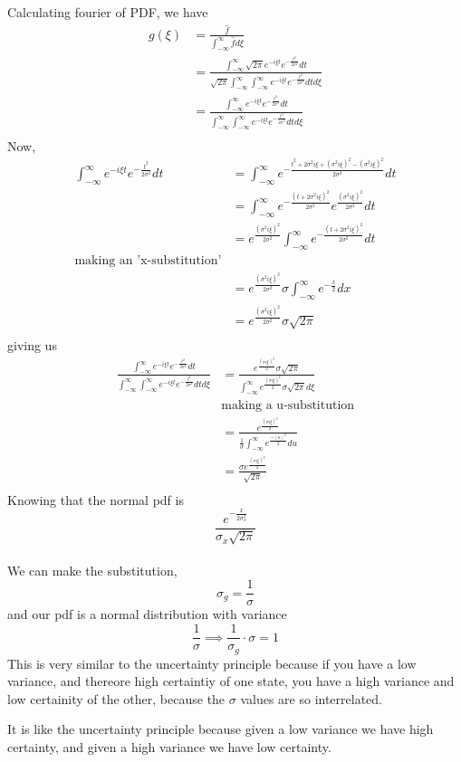 \documentclass[letterpaper,12pt]{article}
\theoremstyle{definition}
\begin{document}
Calculating fourier of PDF, we have
\begin{align*}
    g(\xi) &= \frac{\hat f}{\int^\infty _{-\infty}\hat f d\xi}\\
    & = \frac{\int^\infty_{-\infty} \sqrt{2\pi} e^{-i \xi t} e^{-\frac{t^2}{2\sigma^2} }dt}{\sqrt{2\pi}\int^\infty_{-\infty} \int^\infty_{-\infty} e^{-i \xi t}e^{-\frac{t^2}{2\sigma^2}}dt d\xi}\\
    & = \frac{\int^\infty_{-\infty} e^{-i \xi t} e^{-\frac{t^2}{2\sigma^2} }dt}{\int^\infty_{-\infty} \int^\infty_{-\infty} e^{-i \xi t}e^{-\frac{t^2}{2\sigma^2}}dt d\xi}\\
\end{align*}
Now,
\begin{align*}
    \int^\infty_{-\infty} e^{-i \xi t} e^{-\frac{t^2}{2\sigma^2} }dt 
    & = \int^\infty_{-\infty} e^{-\frac{t^2 + 2\sigma^2 i \xi + (\sigma^2 i \xi)^2 - (\sigma^2 i \xi)^2}{2\sigma^2} }dt \\
    & = \int^\infty_{-\infty} e^{-\frac{(t+ 2\sigma^2 i \xi)^2}{2\sigma^2}}e^{\frac{(\sigma^2 i \xi )^2}{2\sigma^2}  }dt \\
    & = e^{\frac{(\sigma^2 i \xi )^2}{2\sigma^2}} \int^\infty_{-\infty} e^{-\frac{(t+ 2\sigma^2 i \xi)^2}{2\sigma^2}}dt \\ 
    \text{making an 'x-substitution'}&\\
    & = e^{\frac{(\sigma^2 i \xi )^2}{2\sigma^2}} \sigma \int^\infty_{-\infty} e^{-\frac{x}{2}}dx \\ 
    & = e^{\frac{(\sigma^2 i \xi )^2}{2\sigma^2}} \sigma \sqrt{2\pi} \\  
\end{align*}
giving us
\begin{align*}
    \frac{\int^\infty_{-\infty} e^{-i \xi t} e^{-\frac{t^2}{2\sigma^2} }dt}{\int^\infty_{-\infty} \int^\infty_{-\infty} e^{-i \xi t}e^{-\frac{t^2}{2\sigma^2}}dt d\xi} 
    & = \frac{e^{\frac{(\sigma i \xi )^2}{2}} \sigma \sqrt{2\pi}}{\int^\infty _{-\infty} e^{\frac{(\sigma i \xi )^2}{2}} \sigma \sqrt{2\pi} d\xi}\\
    &\text{making a u-substitution}\\
    & = \frac{e^{\frac{(\sigma i \xi )^2}{2}}}
    {\frac{1}{\sigma}\int^\infty _{-\infty} e^{\frac{-(u)^2}{2}}du}\\
    & = \frac{\sigma e^{\frac{(\sigma i \xi )^2}{2}}}{\sqrt{2\pi}}\\
\end{align*}
Knowing that the normal pdf is 
\[\frac{e^{-\frac{x}{2\sigma_x^2}}}{\sigma_x \sqrt{2\pi}}\]\\
We can make the substitution, 
\[\sigma_g = \frac{1}{\sigma}\]
and our pdf is a normal distribution with variance 
\[\frac{1}{\sigma} \implies \frac{1}{\sigma_g}\cdot \sigma = 1\]
This is very similar to the uncertainty principle because if you have a low variance, 
and thereore high certaintiy of one state, you have a high variance and low certainity of the other, because the $\sigma$ values are so interrelated.

It is like the uncertainty principle because given a low variance we have high certainty, and given a high variance we have low certainty.
\end{document}
